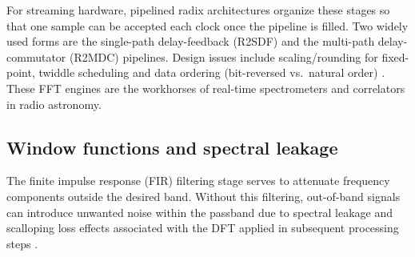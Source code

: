 For streaming hardware, pipelined radix architectures organize these stages so that one sample can be accepted each clock once the pipeline is filled. Two widely used forms are the single-path delay-feedback (R2SDF) and the multi-path delay-commutator (R2MDC) pipelines. Design issues include scaling/rounding for fixed-point, twiddle scheduling and data ordering (bit-reversed vs.\ natural order) \citep{Parsons2009}. These FFT engines are the workhorses of real-time spectrometers and correlators in radio astronomy.


\subsection{Window functions and spectral leakage}
The finite impulse response (FIR) filtering stage serves to attenuate frequency components outside the desired band. Without this filtering, out-of-band signals can introduce unwanted noise within the passband due to spectral leakage and scalloping loss effects associated with the DFT applied in subsequent processing steps \citep{HUANG202061}.

